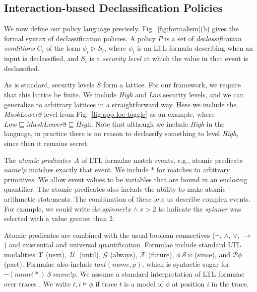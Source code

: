 \documentclass{llncs}
\newcommand{\sch}{\textit{name}}
\newcommand{\tr}{t\xspace}
\newcommand{\tnext}{\mathcal{X}}
\newcommand{\talways}{\mathcal{G}}
\newcommand{\tfuture}{\mathcal{F}}
\newcommand{\tuntil}{~\mathcal{U}~}
\newcommand{\tsince}{~\mathcal{S}~}
\newcommand{\tpast}{\mathcal{P}}
\newcommand{\tlast}[2]{\textit{last}(#1, #2)}
\begin{document}
\subsection{Interaction-based Declassification Policies}
\label{sec:policies}

We now define our policy language precisely.
Fig.~\ref{fig:formalism}(b) gives the formal syntax of
declassification policies.  A policy $P$ is a set of
\emph{declassification conditions} $C_i$ of the form $\phi_i\rhd S_i$,
where $\phi_i$ is an LTL formula describing when an input is
declassified, and $S_i$ is a \emph{security level} at which the value
in that event is declassified.

As is standard, security levels $S$ form a lattice.  For our
framework, we require that this lattice be finite.  We include
\textit{High} and \textit{Low} security levels, and we can generalize
to arbitrary lattices in a straightforward way. Here we include the
\textit{MaskLower8} level from Fig.~\ref{fig:app-loc-toggle} as an
example, where $\textit{Low} \sqsubseteq \textit{MaskLower8}
\sqsubseteq \textit{High}$.  Note that although we include
\textit{High} in the language, in practice there is no reason to
declassify something to level \textit{High}, since then it remains
secret.

The \emph{atomic predicates}~$A$ of LTL formulae match events,
e.g., atomic predicate $\sch!p$ matches exactly that event.
We include $\ast$ for matches to
arbitrary primitives. We allow event values to be
variables that are bound in an enclosing quantifier. The atomic
predicates also include the ability to make atomic arithmetic
statements.  
The combination of these lets us describe complex
events. For example, we could write
$\exists x. \textit{spinner}!x \wedge x > 2$ to indicate the
\emph{spinner} was selected with a value greater than 2.

Atomic predicates are combined with the usual boolean connectives
($\neg$, $\wedge$, $\vee$, $\rightarrow$) and existential and
universal quantification.  Formulae include standard LTL
modalities $\tnext$ (next), $\tuntil$
(until), $\talways$ (always), $\tfuture$ (future), $\phi \tsince \psi$
(since), and $\tpast \phi$ (past).  Formulae also include
$\tlast{\sch}{p}$, which is syntactic sugar for $\lnot (\sch!\ast)
\tsince \sch!p$.
We assume a standard interpretation of LTL formulae over
traces \cite{Lichtenstein:85}.
We write $\tr, i \models \phi$ if trace $\tr$ is a model of $\phi$ at
position $i$ in the trace.
\end{document}
